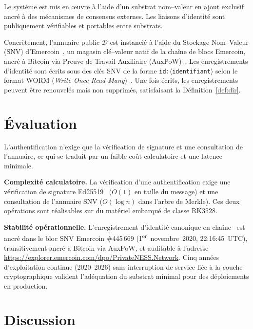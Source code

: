\documentclass[11pt,a4paper]{article}
\begin{document}
Le système est mis en œuvre à l'aide d'un substrat nom--valeur en ajout
exclusif ancré à des mécanismes de consensus externes.  Les liaisons
d'identité sont publiquement vérifiables et portables entre substrats.

Concrètement, l'annuaire public $\mathcal{D}$ est instancié à l'aide du
Stockage Nom--Valeur (SNV) d'Emercoin~\cite{emercoin}, un magasin
clé--valeur natif de la chaîne de blocs Emercoin, ancré à Bitcoin via
Preuve de Travail Auxiliaire (AuxPoW)~\cite{hack51}.  Les enregistrements
d'identité sont écrits sous des clés SNV de la forme
\texttt{id:$\langle$identifiant$\rangle$} selon le format WORM (\emph{Write-Once
Read-Many})~\cite{worm}.  Une fois écrits, les enregistrements peuvent être
renouvelés mais non supprimés, satisfaisant la Définition~\ref{def:dir}.

\section{Évaluation}

L'authentification n'exige que la vérification de signature et une
consultation de l'annuaire, ce qui se traduit par un faible coût calculatoire
et une latence minimale.

\textbf{Complexité calculatoire.}  La vérification d'une authentification
exige une vérification de signature Ed25519~\cite{eddsa} ($O(1)$ en taille
du message) et une consultation de l'annuaire SNV ($O(\log n)$ dans l'arbre
de Merkle).  Ces deux opérations sont réalisables sur du matériel embarqué
de classe RK3528.

\textbf{Stabilité opérationnelle.}  L'enregistrement d'identité canonique
en chaîne~\cite{onchain} est ancré dans le bloc SNV Emercoin \#445\,669
(1\textsuperscript{er}~novembre~2020, 22:16:45~UTC), transitivement ancré à
Bitcoin via AuxPoW, et auditable à l'adresse
\url{https://explorer.emercoin.com/dpo/PrivateNESS.Network}.  Cinq années
d'exploitation continue (2020--2026) sans interruption de service liée à la
couche cryptographique valident l'adéquation du substrat minimal pour des
déploiements en production.

\section{Discussion}
\end{document}
